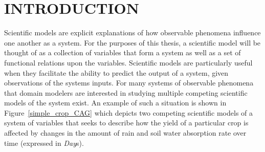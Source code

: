 \chapter{INTRODUCTION\label{chapter:introduction}}
Scientific models are explicit explanations of how observable phenomena influence one another as a system.
For the purposes of this thesis, a scientific model will be thought of as a collection of variables that form a system as well as a set of functional relations upon the variables.
Scientific models are particularly useful when they facilitate the ability to predict the output of a system, given observations of the systems inputs.
For many systems of observable phenomena that domain modelers are interested in studying multiple competing scientific models of the system exist.
An example of such a situation is shown in Figure~\ref{simple_crop_CAG} which depicts two competing scientific models of a system of variables that seeks to describe how the yield of a particular crop is affected by changes in the amount of rain and soil water absorption rate over time (expressed in \emph{Day}s).

